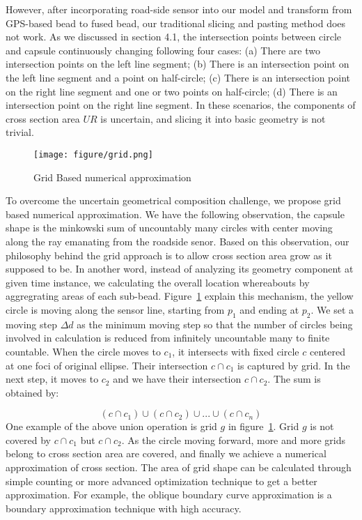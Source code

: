 However, after incorporating road-side sensor into our model and transform from GPS-based bead to
fused bead, our traditional slicing and pasting method does not work. As we discussed in
section 4.1,
the intersection points between circle and capsule continuously changing following four cases: (a) There are
two intersection points on the left line segment; (b) There is an intersection point on the left line segment and a point on half-circle; (c) 
There is an intersection point on the right line segment and
one or two points on half-circle; (d) There is an intersection point on the right line segment. In these scenarios, the components of cross 
section area $UR$ is uncertain, and slicing it into basic geometry is not trivial.
\begin{figure}
    \centering
    \texttt{[image: figure/grid.png]}
    \caption{Grid Based numerical approximation}
    \label{grid}
\end{figure}
To overcome the uncertain geometrical composition challenge, we propose grid based numerical approximation. We have the following observation, 
the capsule shape is
the minkowski sum of uncountably many circles with center moving along the ray emanating from the roadside senor. Based on this observation, our 
philosophy behind the grid approach is to
allow cross section area grow as it supposed to be. In another word, instead of analyzing its geometry
component at given time instance, we calculating the overall location whereabouts by
aggregrating areas of each sub-bead. Figure~\ref{grid} explain this mechanism, the yellow circle is moving along
the sensor line, starting from $p_1$ and ending at $p_2$. We set a moving step $\Delta d$
as the minimum moving step so that the number of circles being involved in calculation is reduced from infinitely uncountable many to finite 
countable. When the circle moves to $c_1$, it intersects with fixed circle $c$ centered at one foci of original ellipse. Their intersection 
$c\cap c_1$ is captured by grid. In the next step, it moves to $c_2$ and we have their intersection $c\cap c_2$. The sum is obtained 
by:

$$(c\cap c_1)\cup (c\cap c_2)\cup ...\cup (c\cap c_n)$$
\noindent
One example of the above union operation is grid $g$ in figure~\ref{grid}. Grid $g$ is not covered by $c\cap c_1$ but $c\cap c_2$. As the 
circle moving forward, more and more grids
belong to cross section area are covered, and finally we achieve a numerical approximation
of cross section. The area of grid shape can be calculated through simple counting or more advanced optimization technique to get a better 
approximation. For example, the oblique boundary curve approximation is a boundary approximation technique with high accuracy.

